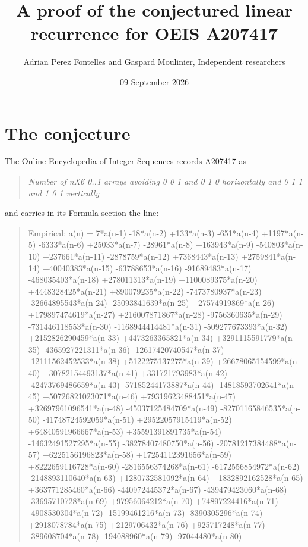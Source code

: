 \documentclass[11pt]{article}
\title{A proof of the conjectured linear recurrence for OEIS A207417}
\author{Adrian Perez Fontelles and Gaspard Moulinier, Independent researchers}
\date{09 September 2026}
\theoremstyle{definition}
\begin{document}
\maketitle
\section{The conjecture}

The Online Encyclopedia of Integer Sequences records \href{https://oeis.org/A207417}{A207417} as

\begin{quote}\itshape Number of nX6 0..1 arrays avoiding 0 0 1 and 0 1 0 horizontally and 0 1 1 and 1 0 1 vertically\end{quote}

and carries in its Formula section the line:

\begin{quote}\ttfamily Empirical: a(n) = 7*a(n-1) -18*a(n-2) +133*a(n-3) -651*a(n-4) +1197*a(n-5) -6333*a(n-6) +25033*a(n-7) -28961*a(n-8) +163943*a(n-9) -540803*a(n-10) +237661*a(n-11) -2878759*a(n-12) +7368443*a(n-13) +2759841*a(n-14) +40040383*a(n-15) -63788653*a(n-16) -91689483*a(n-17) -468035403*a(n-18) +278011313*a(n-19) +1100089375*a(n-20) +4448328425*a(n-21) +890079235*a(n-22) -7473780937*a(n-23) -32664895543*a(n-24) -25093841639*a(n-25) +27574919869*a(n-26) +179897474619*a(n-27) +216007871867*a(n-28) -9756360635*a(n-29) -731446118553*a(n-30) -1168944414481*a(n-31) -509277673393*a(n-32) +2152826290459*a(n-33) +4473263365821*a(n-34) +3291115591779*a(n-35) -4365927221311*a(n-36) -12617420740547*a(n-37) -12111562452533*a(n-38) +5122275137275*a(n-39) +26678065154599*a(n-40) +30782154493137*a(n-41) +331721793983*a(n-42) -42473769486659*a(n-43) -57185244173887*a(n-44) -14818593702641*a(n-45) +50726821023071*a(n-46) +79319623488451*a(n-47) +32697961096541*a(n-48) -45037125484709*a(n-49) -82701165846535*a(n-50) -41748724592059*a(n-51) +29522057915419*a(n-52) +64840591966667*a(n-53) +35591391891735*a(n-54) -14632491527295*a(n-55) -38278407480750*a(n-56) -20781217384488*a(n-57) +6225156196823*a(n-58) +17254112391656*a(n-59) +8222659116728*a(n-60) -2816556374268*a(n-61) -6172556854972*a(n-62) -2148893110640*a(n-63) +1280732581092*a(n-64) +1832892162528*a(n-65) +363771285460*a(n-66) -440972445372*a(n-67) -439479423060*a(n-68) -33695710728*a(n-69) +97956064212*a(n-70) +74897224416*a(n-71) -4908530304*a(n-72) -15199461216*a(n-73) -8390305296*a(n-74) +2918078784*a(n-75) +2129706432*a(n-76) +925717248*a(n-77) -389608704*a(n-78) -194088960*a(n-79) -97044480*a(n-80)\end{quote}
\end{document}
